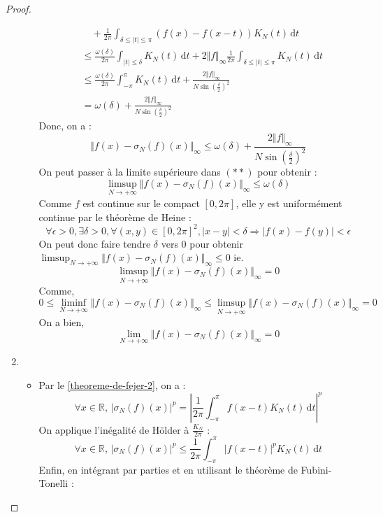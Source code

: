 \begin{proof}
\begin{enumerate}[label=(\roman*)]
\begin{itemize}
\begin{align*}
          &\quad + \frac{1}{2\pi} \int_{\delta \leq \vert t \vert \leq \pi} (f(x) - f(x-t)) K_N(t) \, \mathrm{d}t \\
          &\leq \frac{\omega(\delta)}{2\pi} \int_{\vert t \vert \leq \delta} K_N(t) \, \mathrm{d}t + 2 \Vert f \Vert_\infty \frac{1}{2\pi} \int_{\delta \leq \vert t \vert \leq \pi} K_N(t) \, \mathrm{d}t \\
          &\leq \frac{\omega(\delta)}{2\pi} \int_{-\pi}^{\pi} K_N(t) \, \mathrm{d}t + \frac{2 \Vert f \Vert_\infty}{N \sin \left(\frac{\delta}{2} \right)^2} \\
          &= \omega(\delta) + \frac{2 \Vert f \Vert_\infty}{N \sin \left(\frac{\delta}{2} \right)^2}
        \end{align*}
        Donc, on a :
        \[ \Vert f(x) - \sigma_N(f)(x) \Vert_\infty \leq \omega(\delta) + \frac{2 \Vert f \Vert_\infty}{N \sin \left(\frac{\delta}{2} \right)^2} \tag{**} \]
        On peut passer à la limite supérieure dans $(**)$ pour obtenir :
        \[ \limsup_{N \rightarrow +\infty} \Vert f(x) - \sigma_N(f)(x) \Vert_\infty \leq \omega(\delta) \]
        Comme $f$ est continue sur le compact $[0,2\pi]$, elle y est uniformément continue par le théorème de Heine :
        \[ \forall \epsilon>0, \exists \delta>0, \forall(x,y)\in[0,2\pi]^2, |x-y|<\delta\Rightarrow |f(x)-f(y)|<\epsilon \]
        On peut donc faire tendre $\delta$ vers $0$ pour obtenir $\limsup_{N \rightarrow +\infty} \Vert f(x) - \sigma_N(f)(x) \Vert_\infty \leq 0$
        ie.
        \[ \limsup_{N \rightarrow +\infty} \Vert f(x) - \sigma_N(f)(x) \Vert_\infty = 0 \]
        Comme,
        \[ 0 \leq \liminf_{N \rightarrow +\infty} \Vert f(x) - \sigma_N(f)(x) \Vert_\infty \leq \limsup_{N \rightarrow +\infty} \Vert f(x) - \sigma_N(f)(x) \Vert_\infty = 0 \]
        On a bien,
        \[ \lim_{N \rightarrow +\infty} \Vert f(x) - \sigma_N(f)(x) \Vert_\infty = 0 \]
      \end{itemize}
      \item \begin{itemize}
        \item Par le \cref{theoreme-de-fejer-2}, on a :
        \[ \forall x \in \mathbb{R}, \, \vert \sigma_N(f)(x) \vert^p = \left \vert \frac{1}{2\pi} \int_{-\pi}^{\pi} f(x-t) K_N(t) \, \mathrm{d}t \right \vert^p \]
        On applique l'inégalité de Hölder à $\frac{K_N}{2\pi}$ :
        \[ \forall x \in \mathbb{R}, \, \vert \sigma_N(f)(x) \vert^p \leq \frac{1}{2\pi} \int_{-\pi}^{\pi} \vert f(x-t) \vert^p K_N(t) \, \mathrm{d}t \]
        Enfin, en intégrant par parties et en utilisant le théorème de Fubini-Tonelli :

\end{itemize}
\end{enumerate}
\end{proof}
